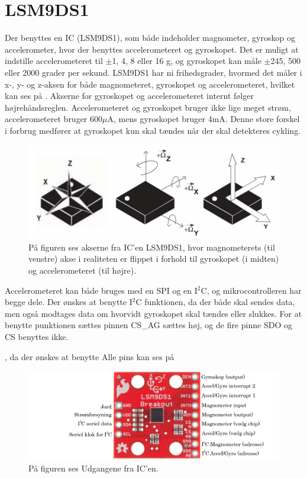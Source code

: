 \section{LSM9DS1}
Der benyttes en IC (LSM9DS1), som både indeholder magnometer, gyroskop og accelerometer, hvor der benyttes accelerometeret og gyroskopet. Det er muligt at indstille accelerometeret til $\pm$1, 4, 8 eller 16 g, og gyroskopet kan måle $\pm$245, 500 eller 2000 grader per sekund.\citep{Jimb02016} \newline
LSM9DS1 har ni frihedsgrader, hvormed det måler i x-, y- og z-aksen for både magnometeret, gyroskopet og accelerometeret, hvilket kan ses på . Akserne for gyroskopet og accelerometeret internt følger højrehåndsreglen.\citep{Jimb02016}\newline
Accelerometeret og gyroskopet bruger ikke lige meget strøm, accelerometeret bruger 600$\mu$A, mens gyroskopet bruger 4mA. Denne store forskel i forbrug medfører at gyroskopet kun skal tændes når der skal detekteres cykling. 

\begin{figure}[H]
	\centering
	\includegraphics[scale=0.6]{figures/cDesign/LSM9DS1.png}
	\caption{På figuren ses akserne fra IC'en LSM9DS1, hvor magnometerets (til venstre) akse i realiteten er flippet i forhold til gyroskopet (i midten) og accelerometeret (til højre).\citep{Jimb02016}}
	\label{vores_IC}
\end{figure}

Accelerometeret kan både bruges med en SPI og en I$^{2}$C, og mikrocontrolleren har begge dele. Der ønskes at benytte I$^{2}$C funktionen, da der både skal sendes data, men også modtages data om hvorvidt gyroskopet skal tændes eller slukkes. For at benytte punktionen sættes pinnen CS\_AG sættes høj, og de fire pinne SDO og CS benyttes ikke. 

, da der ønskes at benytte  Alle pins kan ses på 

\begin{figure}[H]
	\centering
	\includegraphics[scale=0.35]{figures/cDesign/accelerometeret.png}
	\caption{På figuren ses Udgangene fra IC'en.\citep{Jimb02016}}
	\label{IC_pins}
\end{figure}

